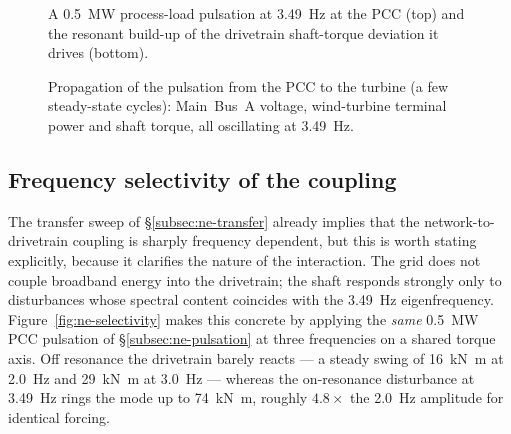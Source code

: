\begin{figure}[t]
  \centering
  \caption{A \SI{0.5}{\mega\watt} process-load pulsation at \SI{3.49}{\hertz}
  at the PCC (top) and the resonant build-up of the drivetrain shaft-torque
  deviation it drives (bottom).}
  \label{fig:ne-pulsation}
\end{figure}

\begin{figure}[t]
  \centering
  \caption{Propagation of the pulsation from the PCC to the turbine (a few
  steady-state cycles): Main~Bus~A voltage, wind-turbine terminal power and
  shaft torque, all oscillating at \SI{3.49}{\hertz}.}
  \label{fig:ne-propagation}
\end{figure}

\subsection{Frequency selectivity of the coupling}
\label{subsec:ne-selectivity}

The transfer sweep of \S\ref{subsec:ne-transfer} already implies that the
network-to-drivetrain coupling is sharply frequency dependent, but this is worth
stating explicitly, because it clarifies the nature of the interaction. The
grid does not couple broadband energy into the drivetrain; the shaft responds
strongly only to disturbances whose spectral content coincides with the
\SI{3.49}{\hertz} eigenfrequency. Figure~\ref{fig:ne-selectivity} makes this
concrete by applying the \emph{same} \SI{0.5}{\mega\watt} PCC pulsation of
\S\ref{subsec:ne-pulsation} at three frequencies on a shared torque axis. Off
resonance the drivetrain barely reacts --- a steady swing of
\SI{16}{\kilo\newton\metre} at \SI{2.0}{\hertz} and \SI{29}{\kilo\newton\metre}
at \SI{3.0}{\hertz} --- whereas the on-resonance disturbance at
\SI{3.49}{\hertz} rings the mode up to \SI{74}{\kilo\newton\metre}, roughly
$4.8\times$ the \SI{2.0}{\hertz} amplitude for identical forcing.

